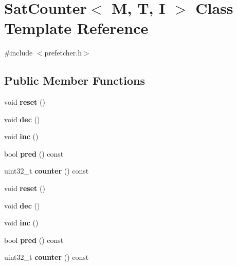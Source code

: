 \hypertarget{classSatCounter}{\section{Sat\-Counter$<$ M, T, I $>$ Class Template Reference}
\label{classSatCounter}
}


{\ttfamily \#include $<$prefetcher.\-h$>$}

\subsection*{Public Member Functions}
\begin{DoxyCompactItemize}
\item 
\hypertarget{classSatCounter_a6756753798da05cf3e70dfc8c323baaa}{void {\bfseries reset} ()}\label{classSatCounter_a6756753798da05cf3e70dfc8c323baaa}

\item 
\hypertarget{classSatCounter_a6c2a59194ffaa90e35c850c75e165099}{void {\bfseries dec} ()}\label{classSatCounter_a6c2a59194ffaa90e35c850c75e165099}

\item 
\hypertarget{classSatCounter_a470adce01e3de69bdd920a42688d8e9e}{void {\bfseries inc} ()}\label{classSatCounter_a470adce01e3de69bdd920a42688d8e9e}

\item 
\hypertarget{classSatCounter_af947aca21a0cf6141689c22ffda54d73}{bool {\bfseries pred} () const }\label{classSatCounter_af947aca21a0cf6141689c22ffda54d73}

\item 
\hypertarget{classSatCounter_aefac107174c110960d5a91990e3447d5}{uint32\-\_\-t {\bfseries counter} () const }\label{classSatCounter_aefac107174c110960d5a91990e3447d5}

\item 
\hypertarget{classSatCounter_a6756753798da05cf3e70dfc8c323baaa}{void {\bfseries reset} ()}\label{classSatCounter_a6756753798da05cf3e70dfc8c323baaa}

\item 
\hypertarget{classSatCounter_a6c2a59194ffaa90e35c850c75e165099}{void {\bfseries dec} ()}\label{classSatCounter_a6c2a59194ffaa90e35c850c75e165099}

\item 
\hypertarget{classSatCounter_a470adce01e3de69bdd920a42688d8e9e}{void {\bfseries inc} ()}\label{classSatCounter_a470adce01e3de69bdd920a42688d8e9e}

\item 
\hypertarget{classSatCounter_af947aca21a0cf6141689c22ffda54d73}{bool {\bfseries pred} () const }\label{classSatCounter_af947aca21a0cf6141689c22ffda54d73}

\item 
\hypertarget{classSatCounter_aefac107174c110960d5a91990e3447d5}{uint32\-\_\-t {\bfseries counter} () const }\label{classSatCounter_aefac107174c110960d5a91990e3447d5}

\end{DoxyCompactItemize}


